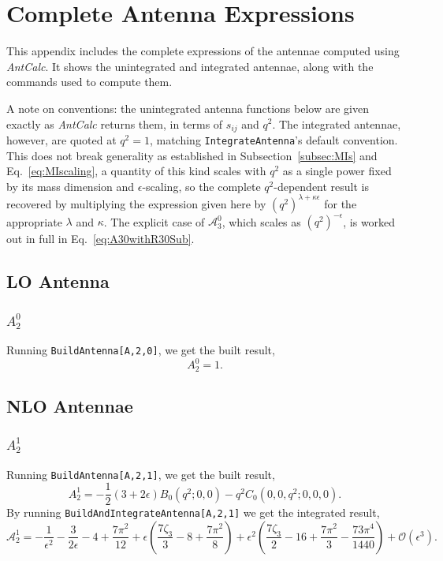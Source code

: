\chapter{Complete Antenna Expressions}\label{ap:antExpressions}

This appendix includes the complete expressions of the antennae computed using
\textit{AntCalc}. It shows the unintegrated and integrated antennae, along with
the commands used to compute them.

A note on conventions: the unintegrated antenna functions below are given exactly as
\textit{AntCalc} returns them, in terms of $s_{ij}$ and $q^2$. The integrated antennae,
however, are quoted at $q^2=1$, matching \texttt{IntegrateAntenna}'s default convention. This
does not break generality as established in Subsection~\ref{subsec:MIs} and Eq.~\eqref{eq:MIscaling}, a
quantity of this kind scales with $q^2$ as a single power fixed by its mass dimension and
$\epsilon$-scaling, so the complete $q^2$-dependent result is recovered by multiplying the
expression given here by $(q^2)^{\lambda+\kappa\epsilon}$ for the appropriate $\lambda$ and
$\kappa$. The explicit case of $\mathcal A_3^0$, which scales as $(q^2)^{-\epsilon}$, is worked
out in full in Eq.~\eqref{eq:A30withR30Sub}. 

\section{LO Antenna}

\subsection{$A_2^0$}
Running \texttt{BuildAntenna[A,2,0]}, we get the built result,
\begin{equation}
    A_2^0 = 1.
\end{equation}

\section{NLO Antennae}

\subsection{$A_2^1$}
Running \texttt{BuildAntenna[A,2,1]}, we get the built result,
\begin{equation}
    A_2^1 = -\frac12(3+2\epsilon)B_0\!\left(q^2;0,0\right) - q^2C_0\!\left(0,0,q^2;0,0,0\right).
\end{equation}
By running \texttt{BuildAndIntegrateAntenna[A,2,1]} we get the integrated result, 
\begin{equation}
    \mathcal A_2^1 = -\frac1{\epsilon^2}-\frac3{2\epsilon}-4+\frac{7\pi^2}{12}+\epsilon\!\left(\frac{7\zeta_3}{3}-8+\frac{7\pi^2}8\right)+\epsilon^2\!\left(\frac{7\zeta_3}2-16+\frac{7\pi^2}3-\frac{73\pi^4}{1440}\right) + \mathcal O\!\left(\epsilon^3\right).
\end{equation}


